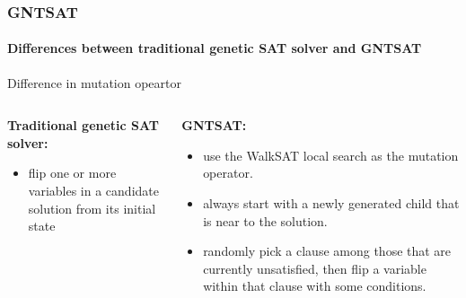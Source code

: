 \begin{frame}[t]
	\frametitle{GNTSAT}
	\framesubtitle{Differences between traditional genetic SAT solver and GNTSAT}
	\begin{block}{Difference in mutation opeartor}
		\begin{columns}[t]
			\begin{column}{0.5\textwidth}
				\textbf{Traditional genetic SAT solver:}
				\begin{itemize}
				\item flip one or more variables in a candidate solution from its initial state
				\end{itemize}
			\end{column}
			\begin{column}{0.5\textwidth}
				\textbf{GNTSAT:}
				\begin{itemize}
				\item use the WalkSAT local search as the mutation operator.
				\item always start with a newly generated child that is near to the solution.
				\item randomly pick a clause among those that are currently unsatisfied, then flip a variable within that clause with some conditions.
				\end{itemize}
				\end{column}
			\end{columns}
	\end{block}
\end{frame}
